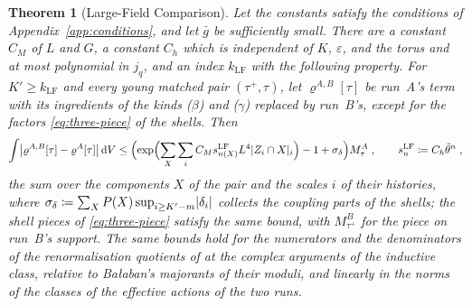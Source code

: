 \documentclass[11pt]{preprint}
\newcommand{\dd}{\mathrm{d}}
\DeclarePairedDelimiter{\abs}{\lvert}{\rvert}
\numberwithin{equation}{section}
\newtheorem{theorem}{Theorem}[section]
\theoremstyle{definition}
\theoremstyle{remark}
\theoremstyle{plain}
\begin{document}
\begin{theorem}[Large-Field Comparison]\label{thm:lf-comparison}
Let the constants satisfy the conditions of Appendix~\ref{app:conditions}, and let $\bar g$ be sufficiently small. There are a constant $C_M$ of $L$ and $G$, a constant $C_h$ which is independent of $K$, $\varepsilon$, and the torus and at most polynomial in $j_q$, and an index $k_{\mathrm{LF}}$ with the following property. For $K' \geq k_{\mathrm{LF}}$ and every young matched pair $(\tau^+, \tau)$, let $\varrho^{A,B}[\tau]$ be run~A's term with its ingredients of the kinds ($\beta$) and ($\gamma$) replaced by run~B's, except for the factors \eqref{eq:three-piece} of the shells. Then
\begin{equation}\label{eq:lf-comparison}
    \int\bigl\lvert\varrho^{A,B}[\tau] - \varrho^A[\tau]\bigr\rvert\,\dd V \leq \Bigl(\exp\Bigl(\sum_{X}\sum_{i}C_Ms^{\mathrm{LF}}_{n(X)}L^4\abs{Z_i \cap X}_i\Bigr) - 1 + \sigma_\delta\Bigr)M^A_\tau\;,
    \qquad
    s^{\mathrm{LF}}_n \coloneqq C_h\tilde\theta^n\;,
\end{equation}
the sum over the components $X$ of the pair and the scales $i$ of their histories, where $\sigma_\delta \coloneqq \sum_XP(X)\sup_{i \geq K'-m}\abs{\delta_i}$ collects the coupling parts of the shells; the shell pieces of \eqref{eq:three-piece} satisfy the same bound, with $M^B_{\tau^+}$ for the piece on run~B's support. The same bounds hold for the numerators and the denominators of the renormalisation quotients of \cite[(1.1), (1.2), p.~356]{BalabanLFR2} at the complex arguments of the inductive class, relative to Ba{\l}aban's majorants of their moduli, and linearly in the norms of the classes of the effective actions of the two runs.
\end{theorem}
\end{document}
